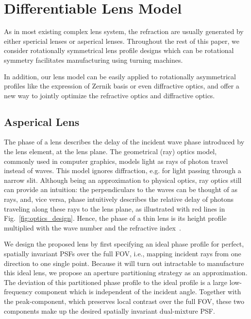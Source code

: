 \section{Differentiable Lens Model}
\label{sec:optics}
As in most existing complex lens system,  the refraction are usually generated by either spericial lenses or asperical lenses.
Throughout the rest of this paper, we consider rotationally symmetrical lens profile designs which can be rotational symmetry facilitates manufacturing using turning machines.

In addition, our lens model can be easily applied to rotationally asymmetrical profiles like the expression 
of Zernik basis or even diffractive optics, and offer a new way to jointly optimize the refractive optics and diffractive optics.
\vspace{-3pt}
\subsection{Asperical Lens}
%
 The phase of a lens describes the delay of the incident wave phase introduced by the lens element, at the lens plane. The geometrical (ray) optics model, commonly used in computer graphics, models light as rays of photon travel instead of waves. 
This model ignores diffraction, e.g. for light passing through a narrow slit. Although being an approximation to physical optics, ray optics still can provide an intuition: the perpendiculars 
to the waves can be thought of as rays, and, vice versa, phase intuitively describes the relative delay of photons traveling along these rays to the lens plane, as illustrated with red lines in Fig.~\ref{fig:optics_design}. Hence, the phase of a thin lens is its height profile multiplied with the wave number and the refractive index~\cite{hecht1998hecht,goodman2005introduction}.  

We design the proposed lens by first specifying an ideal phase profile
for perfect, spatially invariant PSFs over the full FOV, i.e., mapping
incident rays from one direction to one single point. Because it will
turn out intractable to manufacture this ideal lens, we propose an
aperture partitioning strategy as an approximation. The deviation of this
partitioned phase profile to the ideal profile is a
large low-frequency component which is independent of the incident
angle. Together with the peak-component, which preserves local
contrast over the full FOV, these two components make up the desired spatially invariant dual-mixture PSF. 

